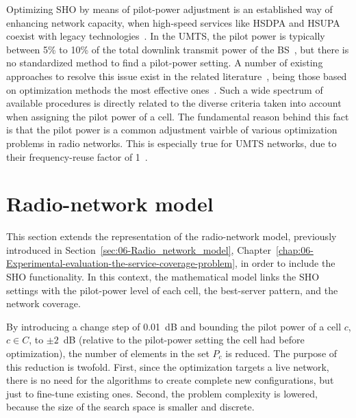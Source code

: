Optimizing SHO by means of pilot-power adjustment is an established
way of enhancing network capacity, when high-speed services like HSDPA
and HSUPA coexist with legacy technologies~\cite{chen2008cpich}.
In the UMTS, the pilot power is typically between 5\% to 10\% of the
total downlink transmit power of the BS~\cite{RadioNetworkPlanningAndOptimisationForUMTS},
but there is no standardized method to fi{}nd a pilot-power setting.
A number of existing approaches to resolve this issue exist in the
related literature~\cite{WCDMAforUMTS_RadioAccessForThirdGenerationMobileCommunications,Siomina_PilotPowerManagementInWCDMANetworksCoverageControlWithRespectToTrafficDistribution,Ying_CPICHPowerSettingsInIrregularWCDMAMacroCellularNetworks},
being those based on optimization methods the most eff{}ective ones~\cite{Eisenblatter_OptimizationMethodsForUMTSRadioNetworkPlanning,GarciaLozano_CPICHPowerOptimisationByMeansOfSimulatedAnnealingInAnUTRAFDDEnvironment,RadioNetworkPlanningAndOptimisationForUMTS,UMTSRadioNetworkPlanning_OptimizationAndQoSManagementForPracticalEngineeringTasks,siomina2008minimum}.
Such a wide spectrum of available procedures is directly related to
the diverse criteria taken into account when assigning the pilot power
of a cell. The fundamental reason behind this fact is that the pilot
power is a common adjustment vairble of various optimization problems
in radio networks. This is especially true for UMTS networks, due
to their frequency-reuse factor of 1~\cite{WCDMAforUMTS_RadioAccessForThirdGenerationMobileCommunications}.


\section{Radio-network model \label{sec:07-Radio_network_model}}

This section extends the representation of the radio-network model,
previously introduced in Section~\ref{sec:06-Radio_network_model},
Chapter~\ref{chap:06-Experimental-evaluation-the-service-coverage-problem},
in order to include the SHO functionality. In this context, the mathematical
model links the SHO settings with the pilot-power level of each cell,
the best-server pattern, and the network coverage.

By introducing a change step of 0.01~dB and bounding the pilot power
of a cell $c$, $c\in C$, to $\pm2$~dB (relative to the pilot-power
setting the cell had before optimization), the number of elements
in the set $P_{c}$ is reduced. The purpose of this reduction is twofold.
First, since the optimization targets a live network, there is no
need for the algorithms to create complete new configurations, but
just to fine-tune existing ones. Second, the problem complexity is
lowered, because the size of the search space is smaller and discrete.


